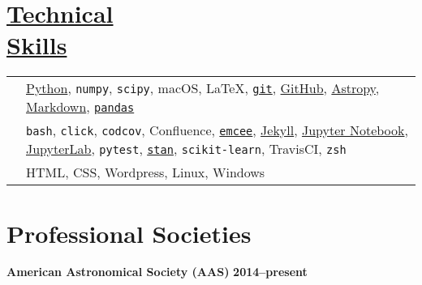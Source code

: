 \documentclass[margin]{res}
\begin{document}
\begin{resume}
\section{\href{https://github.com/benjaminrose}{Technical \\Skills}}
\begin{tabular}{l p{4.5in}}

\hspace{-1em}{\bf Daily Use:} & 
\href{https://www.python.org}{Python},
\texttt{numpy},
\texttt{scipy},
macOS,
\LaTeX,
\href{https://git-scm.com}{\texttt{git}},
\href{https://github.com/benjaminrose}{GitHub},
\href{http://www.astropy.org}{Astropy},
\href{http://daringfireball.net/projects/markdown/}{Markdown},
\href{http://pandas.pydata.org}{\texttt{pandas}}
\\

\hspace{-1em}{\bf Proficient:} & 
\texttt{bash},
\texttt{click},
\texttt{codcov},
Confluence,
\href{http://dan.iel.fm/emcee/current/}{\texttt{emcee}},
\href{https://jekyllrb.com}{Jekyll},
\href{http://jupyter.org}{Jupyter Notebook},
\href{https://jupyterlab.readthedocs.io/en/stable/}{JupyterLab},
\texttt{pytest},
\href{http://mc-stan.org}{\texttt{stan}},
\texttt{scikit-learn},
TravisCI,
\texttt{zsh}
\\

\hspace{-1em}{\bf Competent:} & HTML,
CSS,
Wordpress,
Linux,
Windows %
\end{tabular}













\section{Professional Societies}
{\bf American Astronomical Society (AAS)}  \hfill {\bf 2014--present}\\










\end{resume}
\end{document}

